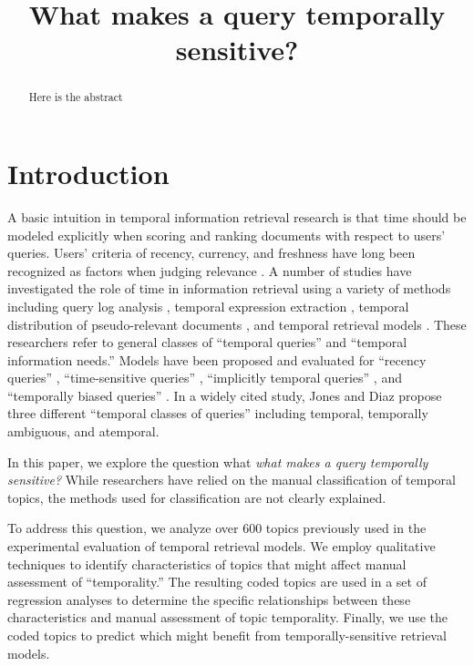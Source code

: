 \documentclass{sig-alternate}
\begin{document}
%

\title{What makes a query temporally sensitive?}

\maketitle
\begin{abstract}
Here is the abstract
\end{abstract}


\terms{}

\keywords{}

\section{Introduction}

A basic intuition in temporal information retrieval research is that time should be modeled explicitly when scoring and ranking documents with respect to users' queries. Users' criteria of recency, currency, and freshness have long been recognized as factors when judging relevance \cite{Barry1998}.  A number of studies have investigated the role of time in information retrieval using a variety of methods including query log analysis \cite{Kulkarni2011,Shokouhi2011,Metzler2009}, temporal expression extraction \cite{Berberich2010, Kanhabua2011}, temporal distribution of pseudo-relevant documents \cite{Jones2007}, and temporal retrieval models \cite{Li2003, Efron2011, Dakka2012}.  These researchers refer to general classes of ``temporal queries'' and ``temporal information needs.''  Models have been proposed and evaluated for ``recency queries'' \cite{Li2003, Efron2011}, ``time-sensitive queries'' \cite{Dakka2012}, ``implicitly temporal queries'' \cite{Metzler2009}, and ``temporally biased queries'' \cite{Jones2007}.  In a widely cited study, Jones and Diaz propose three different ``temporal classes of queries'' \cite{Jones2007} including temporal, temporally ambiguous, and atemporal.

In this paper, we explore the question what \emph{what makes a query temporally sensitive?}  While researchers have relied on the manual classification of temporal topics, the methods used for classification are not clearly explained.

To address this question, we analyze over 600 topics previously used in the experimental evaluation of temporal retrieval models. We employ qualitative techniques to identify characteristics of topics that might affect manual assessment of ``temporality.'' The resulting coded topics are used in a set of regression analyses to determine the specific relationships between these characteristics and manual assessment of topic temporality. Finally, we use the coded topics to predict which might benefit from temporally-sensitive retrieval models.
\end{document}
